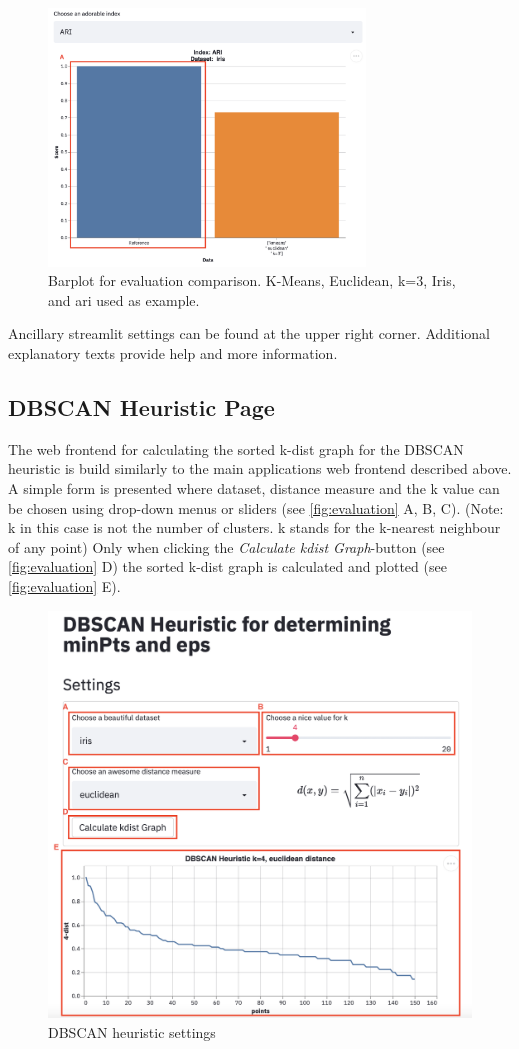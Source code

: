 \documentclass[12pt, english]{article}
\begin{document}
\begin{figure}[H]
	\centering
	\includegraphics[width=0.75\textwidth]{modules/web_frontend/eval_bar.png}
	\caption{Barplot for evaluation comparison. K-Means, Euclidean, k=3, Iris, and ari used as example.}\label{fig:eval_bar}
\end{figure}

Ancillary streamlit settings can be found at the upper right corner. Additional explanatory texts provide help and more information. \\


\subsection{DBSCAN Heuristic Page} \label{heuristicmanual}
The web frontend for calculating the sorted k-dist graph for the DBSCAN heuristic is build similarly to the main applications web frontend described above.
A simple form is presented where dataset, distance measure and the k value can be chosen using drop-down menus or sliders (see \autoref{fig:evaluation} A, B, C). (Note: k in this case is not the number of clusters. k stands for the k-nearest neighbour of any point)
Only when clicking the \textit{Calculate kdist Graph}-button (see \autoref{fig:evaluation} D) the sorted k-dist graph is calculated and plotted (see \autoref{fig:evaluation} E).

\begin{figure}[H]
	\centering
	\includegraphics[width=\linewidth]{modules/web_frontend/dbscan_heuristic.png}
	\caption{DBSCAN heuristic settings}\label{fig:heuristicfrontend}
\end{figure}
\end{document}
